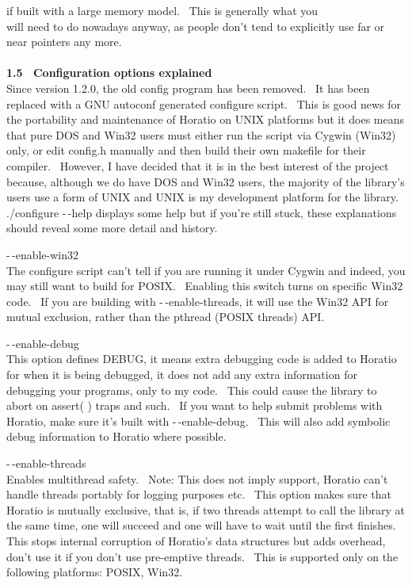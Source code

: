 \documentclass{article}
\begin{document}
if built with a large memory model.~ This is generally what you\\
will need to do nowadays anyway, as people don't tend to explicitly use
far or near pointers any more.\\
\\
\textbf{1.5~ Configuration options explained}
\\
Since version 1.2.0, the old config program has been removed.~ It
has been replaced with a GNU autoconf generated configure script.~
This is good news for the portability and maintenance of Horatio on
UNIX platforms but it does means that pure DOS and Win32 users must
either run the script via Cygwin (Win32) only, or edit config.h
manually and then build their own makefile for their compiler.~
However, I have decided that it is in the best interest of the project
because, although we do have DOS and Win32 users, the majority of the
library's users use a form of UNIX and UNIX is my development platform
for the library.\\
./configure -$\,$-help displays some help but if you're still stuck, these
explanations
should reveal some more detail and history.
\par -$\,$-enable-win32\\
The configure script can't tell if you are running it under Cygwin and
indeed, you may still want to build for POSIX.~ Enabling this
switch turns on specific Win32 code.~ If you are building with
-$\,$-enable-threads, it will use the Win32 API for mutual exclusion,
rather than the pthread (POSIX threads) API.\\

\par -$\,$-enable-debug
\\
This option defines DEBUG, it means extra debugging code is added to
Horatio for when it is being debugged, it does not add any extra
information
for debugging your programs, only to my code.~ This could cause
the
library to abort on assert( ) traps and such.~ If you want to help
submit problems with Horatio, make sure it's built with
-$\,$-enable-debug.~
This will also add symbolic debug information to Horatio where
possible.\\

\par -$\,$-enable-threads
\\
Enables multithread safety.~ Note: This does not imply support,
Horatio can't handle threads portably for logging purposes etc.~
This option makes sure that Horatio is mutually exclusive, that is, if
two threads attempt to call the library at the same time, one will
succeed
and one will have to wait until the first finishes.~ This stops
internal
corruption of Horatio's data structures but adds overhead, don't use
it
if you don't use pre-emptive threads.~ This is supported only on
the
following platforms: POSIX, Win32.\\
\end{document}
